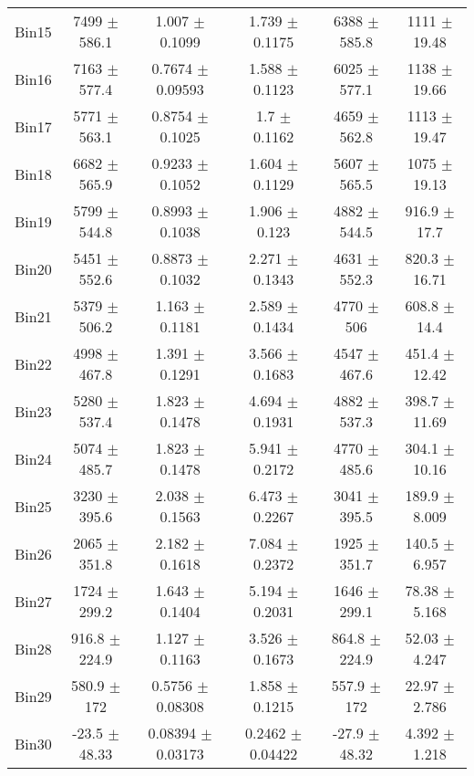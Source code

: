 \begin{tabular}{@{\extracolsep{4pt}}lccccc@{}}
     Bin15 & 7499 $\pm$ 586.1 & 1.007 $\pm$ 0.1099 & 1.739 $\pm$ 0.1175 & 6388 $\pm$ 585.8 & 1111 $\pm$ 19.48 \\ 
     Bin16 & 7163 $\pm$ 577.4 & 0.7674 $\pm$ 0.09593 & 1.588 $\pm$ 0.1123 & 6025 $\pm$ 577.1 & 1138 $\pm$ 19.66 \\ 
     Bin17 & 5771 $\pm$ 563.1 & 0.8754 $\pm$ 0.1025 & 1.7 $\pm$ 0.1162 & 4659 $\pm$ 562.8 & 1113 $\pm$ 19.47 \\ 
     Bin18 & 6682 $\pm$ 565.9 & 0.9233 $\pm$ 0.1052 & 1.604 $\pm$ 0.1129 & 5607 $\pm$ 565.5 & 1075 $\pm$ 19.13 \\ 
     Bin19 & 5799 $\pm$ 544.8 & 0.8993 $\pm$ 0.1038 & 1.906 $\pm$ 0.123 & 4882 $\pm$ 544.5 & 916.9 $\pm$ 17.7 \\ 
     Bin20 & 5451 $\pm$ 552.6 & 0.8873 $\pm$ 0.1032 & 2.271 $\pm$ 0.1343 & 4631 $\pm$ 552.3 & 820.3 $\pm$ 16.71 \\ 
     Bin21 & 5379 $\pm$ 506.2 & 1.163 $\pm$ 0.1181 & 2.589 $\pm$ 0.1434 & 4770 $\pm$ 506 & 608.8 $\pm$ 14.4 \\ 
     Bin22 & 4998 $\pm$ 467.8 & 1.391 $\pm$ 0.1291 & 3.566 $\pm$ 0.1683 & 4547 $\pm$ 467.6 & 451.4 $\pm$ 12.42 \\ 
     Bin23 & 5280 $\pm$ 537.4 & 1.823 $\pm$ 0.1478 & 4.694 $\pm$ 0.1931 & 4882 $\pm$ 537.3 & 398.7 $\pm$ 11.69 \\ 
     Bin24 & 5074 $\pm$ 485.7 & 1.823 $\pm$ 0.1478 & 5.941 $\pm$ 0.2172 & 4770 $\pm$ 485.6 & 304.1 $\pm$ 10.16 \\ 
     Bin25 & 3230 $\pm$ 395.6 & 2.038 $\pm$ 0.1563 & 6.473 $\pm$ 0.2267 & 3041 $\pm$ 395.5 & 189.9 $\pm$ 8.009 \\ 
     Bin26 & 2065 $\pm$ 351.8 & 2.182 $\pm$ 0.1618 & 7.084 $\pm$ 0.2372 & 1925 $\pm$ 351.7 & 140.5 $\pm$ 6.957 \\ 
     Bin27 & 1724 $\pm$ 299.2 & 1.643 $\pm$ 0.1404 & 5.194 $\pm$ 0.2031 & 1646 $\pm$ 299.1 & 78.38 $\pm$ 5.168 \\ 
     Bin28 & 916.8 $\pm$ 224.9 & 1.127 $\pm$ 0.1163 & 3.526 $\pm$ 0.1673 & 864.8 $\pm$ 224.9 & 52.03 $\pm$ 4.247 \\ 
     Bin29 & 580.9 $\pm$ 172 & 0.5756 $\pm$ 0.08308 & 1.858 $\pm$ 0.1215 & 557.9 $\pm$ 172 & 22.97 $\pm$ 2.786 \\ 
     Bin30 & -23.5 $\pm$ 48.33 & 0.08394 $\pm$ 0.03173 & 0.2462 $\pm$ 0.04422 & -27.9 $\pm$ 48.32 & 4.392 $\pm$ 1.218 \\ 
\hline\hline
  \end{tabular}
